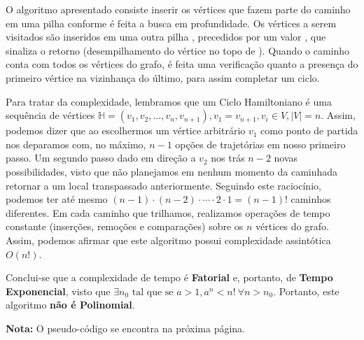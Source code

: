 \documentclass{homework}
\begin{document}
	O algoritmo apresentado consiste inserir os vértices que fazem parte do caminho em uma pilha  conforme é feita a busca em profundidade. Os vértices a serem visitados são inseridos em uma outra pilha , precedidos por um valor , que sinaliza o retorno (desempilhamento do vértice no topo de ). Quando o caminho conta com todos os vértices do grafo, é feita uma verificação quanto a presença do primeiro vértice na vizinhança do último, para assim completar um ciclo.\par
	
	Para tratar da complexidade, lembramos que um Ciclo Hamiltoniano é uma sequência de vértices $\mathbb{H} = (v_1, v_2, \dots, v_n, v_{n+1}), v_{1} = v_{n+1}, v_{i} \in V, |V| = n$. Assim, podemos dizer que ao escolhermos um vértice arbitrário $v_{1}$ como ponto de partida nos deparamos com, no máximo, $n - 1$ opções de trajetórias em nosso primeiro passo. Um segundo passo dado em direção a $v_{2}$ nos trás $n-2$ novas possibilidades, visto que não planejamos em nenhum momento da caminhada retornar a um local transpassado anteriormente. Seguindo este raciocínio, podemos ter até mesmo $(n-1) \cdot (n-2) \cdot \cdots \cdot 2 \cdot 1 = (n-1)!$ caminhos diferentes. Em cada caminho que trilhamos, realizamos operações de tempo constante (inserções, remoções e comparações) sobre os $n$ vértices do grafo. Assim, podemos afirmar que este algoritmo possui complexidade assintótica $O(n!)$.\par
	
	Conclui-se que a complexidade de tempo é \textbf{Fatorial} e, portanto, de \textbf{Tempo Exponencial}, visto que $\exists n_0 \text{ tal que se } a > 1, a^n < n! ~ \forall n > n_0$. Portanto, este algoritmo \textbf{não é Polinomial}.
	
	\textbf{Nota:} O pseudo-código se encontra na próxima página.
	
	\newpage
	
\end{document}
